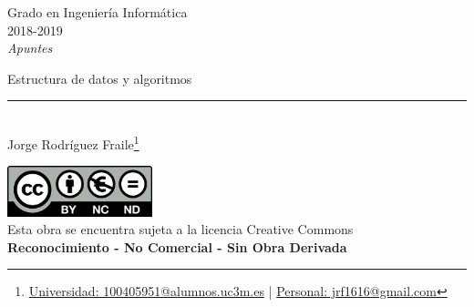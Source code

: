 \documentclass[12pt, twoside, openright]{report} %
\begin{document}
	
\begin{titlepage}
	\begin{sffamily}
	\color{azulUC3M}
	\begin{center}
		\begin{figure}[H] %
		\end{figure}
		\vspace{2.5cm}
		\begin{Large}
			Grado en Ingeniería Informática\\			
			2018-2019\\
			\vspace{2cm}		
			\textsl{Apuntes}\\
			\bigskip
		\end{Large}
		 	{\Huge Estructura de datos y algoritmos}\\
		 	\vspace*{0.5cm}
	 		\rule{10.5cm}{0.1mm}\\
			\vspace*{0.9cm}
			{\LARGE Jorge Rodríguez Fraile\footnote{\href{mailto:100405951@alumnos.uc3m.es}{Universidad: 100405951@alumnos.uc3m.es}  |  \href{mailto:jrf1616@gmail.com}{Personal: jrf1616@gmail.com}}}\\ 
			\vspace*{1cm}
	\end{center}
	\vfill
	\color{black}
		\includegraphics[width=4.2cm]{img/creativecommons.png}\\
		Esta obra se encuentra sujeta a la licencia Creative Commons\\ \textbf{Reconocimiento - No Comercial - Sin Obra Derivada}
	\end{sffamily}
\end{titlepage}


\tableofcontents
\thispagestyle{fancy}
\end{document}
